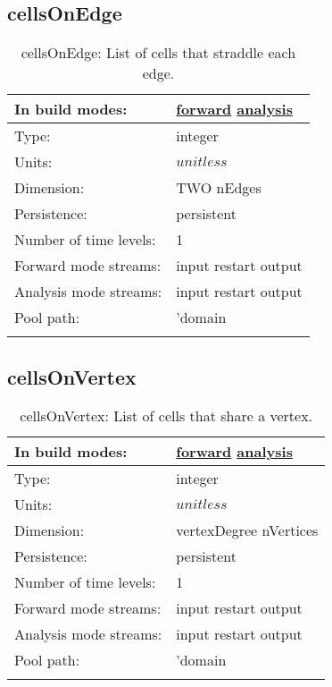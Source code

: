 \subsection[cellsOnEdge]{cellsOnEdge}
\label{subsec:var_sec_mesh_cellsOnEdge}
\begin{center}
\begin{longtable}{| p{2.0in} | p{4.0in} |}
        \hline 
        In build modes: & \hyperref[subsec:forward_var_tab_mesh]{forward} \hyperref[subsec:analysis_var_tab_mesh]{analysis} \\
        \hline 
        Type: & integer \\
        \hline 
        Units: & $unitless$ \\
        \hline 
        Dimension: & TWO nEdges \\
        \hline 
        Persistence: & persistent \\
        \hline 
        Number of time levels: & 1 \\
        \hline 
		 Forward mode streams: &  input restart output \\
        \hline 
		 Analysis mode streams: &  input restart output \\
        \hline 
            Pool path: & 'domain %
 \\
		 \hline 
    \caption{cellsOnEdge: List of cells that straddle each edge.}
\end{longtable}
\end{center}
\subsection[cellsOnVertex]{cellsOnVertex}
\label{subsec:var_sec_mesh_cellsOnVertex}
\begin{center}
\begin{longtable}{| p{2.0in} | p{4.0in} |}
        \hline 
        In build modes: & \hyperref[subsec:forward_var_tab_mesh]{forward} \hyperref[subsec:analysis_var_tab_mesh]{analysis} \\
        \hline 
        Type: & integer \\
        \hline 
        Units: & $unitless$ \\
        \hline 
        Dimension: & vertexDegree nVertices \\
        \hline 
        Persistence: & persistent \\
        \hline 
        Number of time levels: & 1 \\
        \hline 
		 Forward mode streams: &  input restart output \\
        \hline 
		 Analysis mode streams: &  input restart output \\
        \hline 
            Pool path: & 'domain %
 \\
		 \hline 
    \caption{cellsOnVertex: List of cells that share a vertex.}
\end{longtable}
\end{center}
